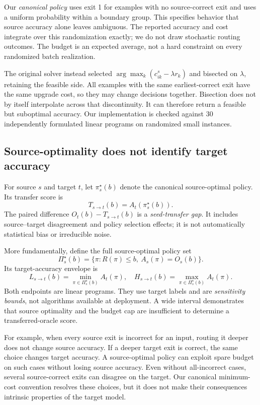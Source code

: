 \documentclass[11pt,a4paper]{article}
\begin{document}
Our \emph{canonical policy} uses exit 1 for examples with no source-correct exit and uses a uniform probability within a boundary group. This specifies behavior that source accuracy alone leaves ambiguous. The reported accuracy and cost integrate over this randomization exactly; we do not draw stochastic routing outcomes. The budget is an expected average, not a hard constraint on every randomized batch realization.

The original solver instead selected $\arg\max_k(c^s_{ik}-\lambda r_k)$ and bisected on $\lambda$, retaining the feasible side. All examples with the same earliest-correct exit have the same upgrade cost, so they may change decisions together. Bisection does not by itself interpolate across that discontinuity. It can therefore return a feasible but suboptimal accuracy. Our implementation is checked against 30 independently formulated linear programs on randomized small instances.

\subsection{Source-optimality does not identify target accuracy}
For source $s$ and target $t$, let $\pi^\star_s(b)$ denote the canonical source-optimal policy. Its transfer score is
\begin{equation}
 T_{s\rightarrow t}(b)=A_t(\pi^\star_s(b)).
\end{equation}
The paired difference $O_t(b)-T_{s\rightarrow t}(b)$ is a \emph{seed-transfer gap}. It includes source--target disagreement and policy selection effects; it is not automatically statistical bias or irreducible noise.

More fundamentally, define the full source-optimal policy set
\begin{equation}
 \Pi_s^\star(b)=\{\pi:R(\pi)\leq b,\ A_s(\pi)=O_s(b)\}.
\end{equation}
Its target-accuracy envelope is
\begin{equation}
 L_{s\rightarrow t}(b)=\min_{\pi\in\Pi_s^\star(b)}A_t(\pi),\quad
 H_{s\rightarrow t}(b)=\max_{\pi\in\Pi_s^\star(b)}A_t(\pi).
 \label{eq:envelope}
\end{equation}
Both endpoints are linear programs. They use target labels and are \emph{sensitivity bounds}, not algorithms available at deployment. A wide interval demonstrates that source optimality and the budget cap are insufficient to determine a transferred-oracle score.

For example, when every source exit is incorrect for an input, routing it deeper does not change source accuracy. If a deeper target exit is correct, the same choice changes target accuracy. A source-optimal policy can exploit spare budget on such cases without losing source accuracy. Even without all-incorrect cases, several source-correct exits can disagree on the target. Our canonical minimum-cost convention resolves these choices, but it does not make their consequences intrinsic properties of the target model.
\end{document}
